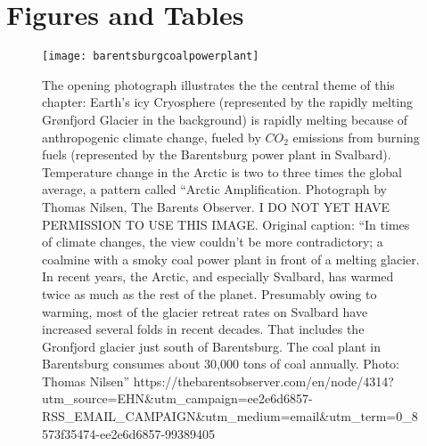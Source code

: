 \section{Figures and Tables}   \label{Cryosphere_Figures}

\begin{figure}[p]
\centering
\texttt{[image: barentsburgcoalpowerplant]}%
\caption{The opening photograph illustrates the the central theme of this chapter: Earth's icy Cryosphere (represented by the rapidly melting Gr\o nfjord Glacier in the background) is rapidly melting because of anthropogenic climate change, fueled by $CO_2$ emissions from burning  fuels (represented by the Barentsburg power plant in Svalbard). Temperature change in the Arctic is two to three times the global average, a pattern called ``Arctic Amplification. Photograph by Thomas Nilsen, The Barents Observer. I DO NOT YET HAVE PERMISSION TO USE THIS IMAGE. Original caption: ``In times of climate changes, the view couldn't be more contradictory; a coalmine with a smoky coal power plant in front of a melting glacier. In recent years, the Arctic, and especially Svalbard, has warmed twice as much as the rest of the planet. Presumably owing to warming, most of the glacier retreat rates on Svalbard have increased several folds in recent decades. That includes the Gronfjord glacier just south of Barentsburg. The coal plant in Barentsburg consumes about 30,000 tons of coal annually.  Photo: Thomas Nilsen'' https://thebarentsobserver.com/en/node/4314?utm\_source=EHN\&utm\_campaign=ee2e6d6857-RSS\_EMAIL\_CAMPAIGN\&utm\_medium=email\&utm\_term=0\_8573f35474-ee2e6d6857-99389405} 
\label{fig:Barentsburg}
\end{figure}


